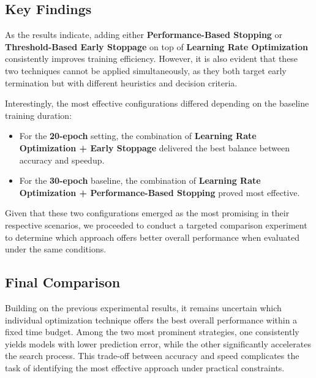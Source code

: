 \vspace{2.5\baselineskip}

\subsection*{Key Findings}

As the results indicate, adding either \textbf{Performance-Based Stopping} or \textbf{Threshold-Based Early Stoppage} on top of \textbf{Learning Rate Optimization} consistently improves training efficiency. However, it is also evident that these two techniques cannot be applied simultaneously, as they both target early termination but with different heuristics and decision criteria.

Interestingly, the most effective configurations differed depending on the baseline training duration:

\begin{itemize}
    \item For the \textbf{20-epoch} setting, the combination of \textbf{Learning Rate Optimization + Early Stoppage} delivered the best balance between accuracy and speedup.
    \item For the \textbf{30-epoch} baseline, the combination of \textbf{Learning Rate Optimization + Performance-Based Stopping} proved most effective.
\end{itemize}

Given that these two configurations emerged as the most promising in their respective scenarios, we proceeded to conduct a targeted comparison experiment to determine which approach offers better overall performance when evaluated under the same conditions.

\vspace{2.5\baselineskip}

\subsection{Final Comparison}

Building on the previous experimental results, it remains uncertain which individual optimization technique offers the best overall performance within a fixed time budget. Among the two most prominent strategies, one consistently yields models with lower prediction error, while the other significantly accelerates the search process. This trade-off between accuracy and speed complicates the task of identifying the most effective approach under practical constraints.

